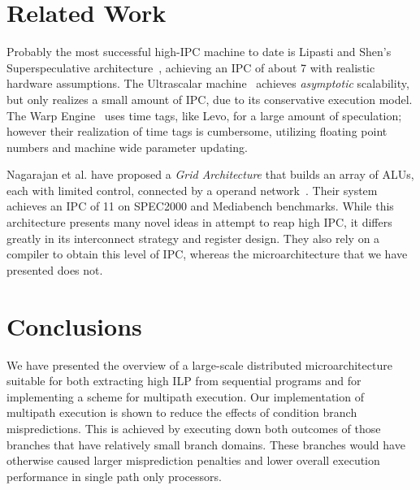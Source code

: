 \documentclass[10pt,dvips]{article}
\begin{document}
\section{Related Work}
%
Probably the most successful high-IPC machine to date is
Lipasti and Shen's Superspeculative
architecture~\cite{Lip97}, achieving an IPC of
about 7 with realistic hardware assumptions.
The Ultrascalar machine~\cite{Hen00}
achieves {\em asymptotic} scalability,
but only realizes a small amount of IPC,
due to its conservative execution model.
The Warp Engine~\cite{Cle95}
uses time tags, like Levo, for a large amount of speculation;
however their realization of time
tags is cumbersome, utilizing floating point
numbers and machine wide parameter updating.

Nagarajan et al. have proposed a {\em Grid Architecture} that
builds an array of ALUs, each with limited control, connected
by a operand network~\cite{Nag01}.  Their system achieves an IPC of 11 on
SPEC2000 and Mediabench benchmarks.  While this architecture
presents many novel ideas in attempt to reap high IPC, it
differs greatly in its interconnect strategy and register design.
They also rely on a compiler to obtain this level of IPC, whereas
the microarchitecture that we have presented does not.
%
\section{Conclusions}
%
We have presented the overview of a large-scale distributed 
microarchitecture suitable for both extracting high ILP from
sequential programs and for implementing a scheme for
multipath execution.
Our implementation of multipath execution is shown to reduce
the effects of condition branch mispredictions.
This is achieved by executing down both outcomes of those
branches that have relatively small branch domains.  These branches
would have otherwise caused larger misprediction penalties and lower
overall execution performance in single
path only processors.



\end{document}
